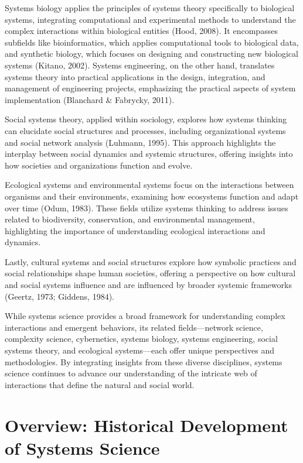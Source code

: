 \documentclass[twocolumn]{article}
\begin{document}
\textcolor{secondary}{Systems biology applies the principles of systems theory specifically to biological systems, integrating computational and experimental methods to understand the complex interactions within biological entities (Hood, 2008). It encompasses subfields like bioinformatics, which applies computational tools to biological data, and synthetic biology, which focuses on designing and constructing new biological systems (Kitano, 2002). Systems engineering, on the other hand, translates systems theory into practical applications in the design, integration, and management of engineering projects, emphasizing the practical aspects of system implementation (Blanchard \& Fabrycky, 2011).}

\textcolor{primary}{Social systems theory, applied within sociology, explores how systems thinking can elucidate social structures and processes, including organizational systems and social network analysis (Luhmann, 1995). This approach highlights the interplay between social dynamics and systemic structures, offering insights into how societies and organizations function and evolve.}

\textcolor{secondary}{Ecological systems and environmental systems focus on the interactions between organisms and their environments, examining how ecosystems function and adapt over time (Odum, 1983). These fields utilize systems thinking to address issues related to biodiversity, conservation, and environmental management, highlighting the importance of understanding ecological interactions and dynamics.}

\textcolor{primary}{Lastly, cultural systems and social structures explore how symbolic practices and social relationships shape human societies, offering a perspective on how cultural and social systems influence and are influenced by broader systemic frameworks (Geertz, 1973; Giddens, 1984).}

\textcolor{secondary}{While systems science provides a broad framework for understanding complex interactions and emergent behaviors, its related fields—network science, complexity science, cybernetics, systems biology, systems engineering, social systems theory, and ecological systems—each offer unique perspectives and methodologies. By integrating insights from these diverse disciplines, systems science continues to advance our understanding of the intricate web of interactions that define the natural and social world.}

\section{Overview: Historical Development of Systems Science}
\end{document}
